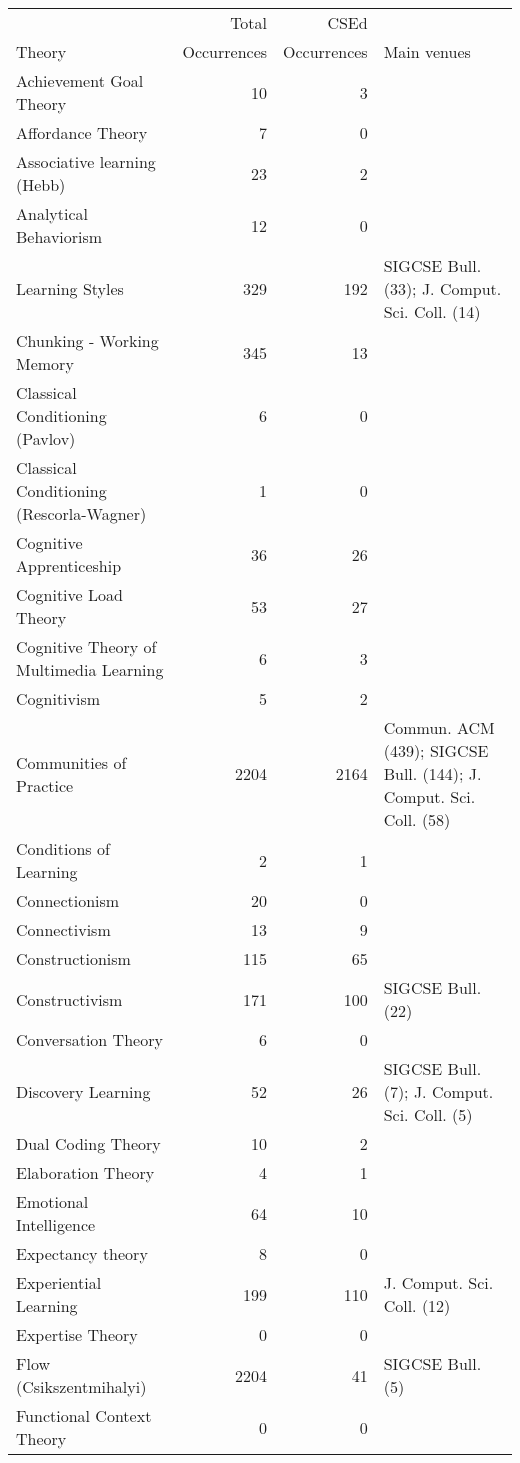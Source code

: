 \begin{table*}[t]
\begin{tabular}{lrrp{6cm}}
& Total & CSEd & \\Theory & Occurrences & Occurrences & Main venues\\\hline
Achievement Goal Theory & 10 & 3 &  \\
Affordance Theory & 7 & 0 &  \\
Associative learning (Hebb) & 23 & 2 &  \\
Analytical Behaviorism & 12 & 0 &  \\
Learning Styles & 329 & 192 & SIGCSE Bull. (33); J. Comput. Sci. Coll. (14) \\
Chunking - Working Memory & 345 & 13 &  \\
Classical Conditioning (Pavlov) & 6 & 0 &  \\
Classical Conditioning (Rescorla-Wagner) & 1 & 0 &  \\
Cognitive Apprenticeship & 36 & 26 &  \\
Cognitive Load Theory & 53 & 27 &  \\
Cognitive Theory of Multimedia Learning & 6 & 3 &  \\
Cognitivism & 5 & 2 &  \\
Communities of Practice & 2204 & 2164 & Commun. ACM (439); SIGCSE Bull. (144); J. Comput. Sci. Coll. (58) \\
Conditions of Learning & 2 & 1 &  \\
Connectionism & 20 & 0 &  \\
Connectivism & 13 & 9 &  \\
Constructionism & 115 & 65 &  \\
Constructivism & 171 & 100 & SIGCSE Bull. (22) \\
Conversation Theory & 6 & 0 &  \\
Discovery Learning & 52 & 26 & SIGCSE Bull. (7); J. Comput. Sci. Coll. (5) \\
Dual Coding Theory & 10 & 2 &  \\
Elaboration Theory & 4 & 1 &  \\
Emotional Intelligence & 64 & 10 &  \\
Expectancy theory & 8 & 0 &  \\
Experiential Learning & 199 & 110 & J. Comput. Sci. Coll. (12) \\
Expertise Theory & 0 & 0 &  \\
Flow (Csikszentmihalyi) & 2204 & 41 & SIGCSE Bull. (5) \\
Functional Context Theory & 0 & 0 &  \\

\end{tabular}
\end{table*}
